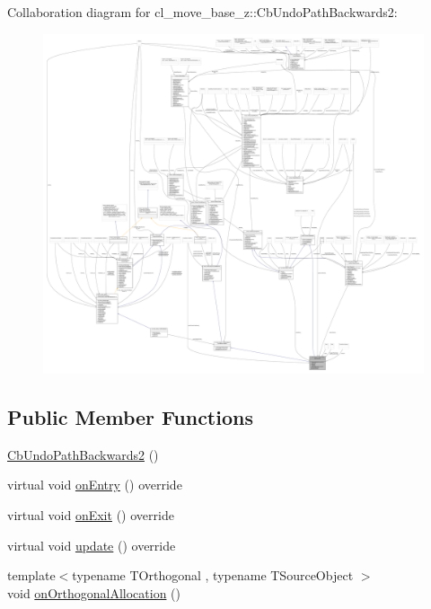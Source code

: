 Collaboration diagram for cl\+\_\+move\+\_\+base\+\_\+z\+:\+:Cb\+Undo\+Path\+Backwards2\+:
\nopagebreak
\begin{figure}[H]
\begin{center}
\leavevmode
\includegraphics[width=350pt]{classcl__move__base__z_1_1CbUndoPathBackwards2__coll__graph}
\end{center}
\end{figure}
\subsection*{Public Member Functions}
\begin{DoxyCompactItemize}
\item 
\hyperlink{classcl__move__base__z_1_1CbUndoPathBackwards2_a0f202bf7a4b1cc1db426a0c2ad1434f6}{Cb\+Undo\+Path\+Backwards2} ()
\item 
virtual void \hyperlink{classcl__move__base__z_1_1CbUndoPathBackwards2_a1b96187df9be6ce0fbdb5511147685d3}{on\+Entry} () override
\item 
virtual void \hyperlink{classcl__move__base__z_1_1CbUndoPathBackwards2_ae493fcd813176d8473ff08680beb7afe}{on\+Exit} () override
\item 
virtual void \hyperlink{classcl__move__base__z_1_1CbUndoPathBackwards2_a62f0d53fc341ca6d241637cc0e4b2e30}{update} () override
\item 
{\footnotesize template$<$typename T\+Orthogonal , typename T\+Source\+Object $>$ }\\void \hyperlink{classcl__move__base__z_1_1CbUndoPathBackwards2_a61148b9509b489efc382ecdeb9bcf9c2}{on\+Orthogonal\+Allocation} ()
\end{DoxyCompactItemize}
